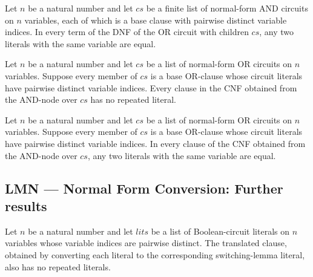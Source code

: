 \begin{theorem}
\label{BoolCircuit.NOrCircuit.toDNF_var_inj}
\leanok
{}
Let $n$ be a natural number and let $cs$ be a finite list of normal-form AND circuits on
$n$ variables, each of which is a base clause with pairwise distinct variable indices.
In every term of the DNF of the OR circuit with children $cs$, any two literals with the
same variable are equal.
\end{theorem}

\begin{theorem}
\label{BoolCircuit.NAndCircuit.toCNF_clauses_nodup}
\leanok
{}
Let $n$ be a natural number and let $cs$ be a list of normal-form OR circuits on $n$
variables. Suppose every member of $cs$ is a base OR-clause whose circuit literals have
pairwise distinct variable indices. Every clause in the CNF obtained from the AND-node
over $cs$ has no repeated literal.
\end{theorem}

\begin{theorem}
\label{BoolCircuit.NAndCircuit.toCNF_var_inj}
\leanok
{}
Let $n$ be a natural number and let $cs$ be a list of normal-form OR circuits on $n$
variables. Suppose every member of $cs$ is a base OR-clause whose circuit literals have
pairwise distinct variable indices. In every clause of the CNF obtained from the
AND-node over $cs$, any two literals with the same variable are equal.
\end{theorem}

\subsection*{LMN --- Normal Form Conversion: Further results}

\begin{theorem}
\label{BoolCircuit.NOrCircuit.clauseToClause_nodup}
\leanok
{}
Let $n$ be a natural number and let $lits$ be a list of Boolean-circuit literals on $n$
variables whose variable indices are pairwise distinct. The translated clause, obtained
by converting each literal to the corresponding switching-lemma literal, also has no
repeated literals.
\end{theorem}


